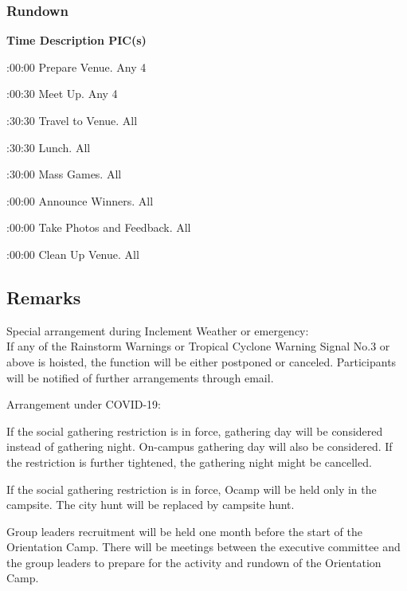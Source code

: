 \subsubsection{Rundown}

\setupTABLE[c][1][width=1.25in]
\setupTABLE[c][2][width=3.5in]
\setupTABLE[c][3][width=1.25in]
\bTABLE
\bTABLEhead

\bTR\bTH    \bf{Time}
\eTH\bTH    \bf{Description}
\eTH\bTH    \bf{PIC(s)}
\eTH\eTR

\eTABLEhead
\bTABLEbody

\bTR{}:00:00
\eTD\bTD Prepare Venue.
\eTD\bTD Any 4
\eTD\eTR

\bTR{}:00:30
\eTD\bTD Meet Up.
\eTD\bTD Any 4
\eTD\eTR

\bTR{}:30:30
\eTD\bTD Travel to Venue.
\eTD\bTD All
\eTD\eTR

\bTR{}:30:30
\eTD\bTD Lunch.
\eTD\bTD All
\eTD\eTR

\bTR{}:30:00
\eTD\bTD Mass Games.
\eTD\bTD All
\eTD\eTR

\bTR{}:00:00
\eTD\bTD Announce Winners.
\eTD\bTD All
\eTD\eTR

\bTR{}:00:00
\eTD\bTD Take Photos and Feedback.
\eTD\bTD All
\eTD\eTR

\bTR{}:00:00
\eTD\bTD Clean Up Venue.
\eTD\bTD All
\eTD\eTR

\eTABLEbody
\eTABLE

\subsection{Remarks}
\startitemize
\item Special arrangement during Inclement Weather or emergency: \\
If any of the Rainstorm Warnings or Tropical Cyclone Warning Signal No.3 or above is hoisted, the function will be either postponed or canceled. Participants will be notified of further arrangements through email.
\item Arrangement under COVID-19: \startitemize
\item If the social gathering restriction is in force, gathering day will be considered instead of gathering night. On-campus gathering day will also be considered. If the restriction is further tightened, the gathering night might be cancelled.
\item If the social gathering restriction is in force, Ocamp will be held only in the campsite. The city hunt will be replaced by campsite hunt. \stopitemize
\item Group leaders recruitment will be held one month before the start of the Orientation Camp. There will be meetings between the executive committee and the group leaders to prepare for the activity and rundown of the Orientation Camp. 
\stopitemize

\pagebreak
